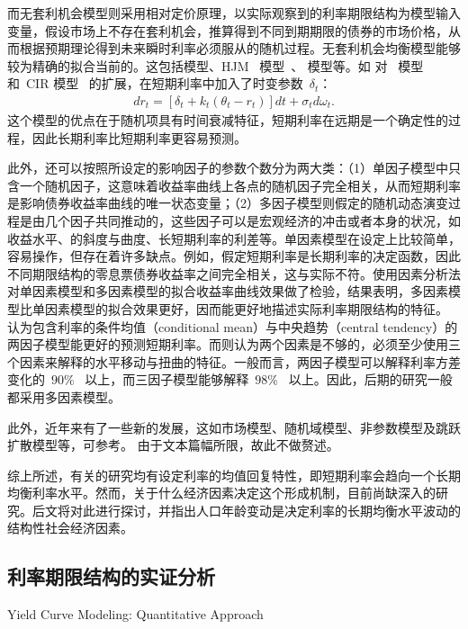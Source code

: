而无套利机会模型则采用相对定价原理，以实际观察到的利率期限结构为模型输入变量，假设市场上不存在套利机会，推算得到不同到期期限的债券的市场价格，从而根据预期理论得到未来瞬时利率必须服从的随机过程。无套利机会均衡模型能够较为精确的拟合当前的\ts{}。这包括模型、HJM~ 模型~\cite{heath1992bond}、 模型等。如 对\citeauthor{vasicek1977equilibrium}~ 模型和~CIR 模型~\cite{cox1985theory} 的扩展，在短期利率中加入了时变参数~$\delta_t$：
\begin{align}
  dr_t = [\delta_t + k_t(\theta_t - r_t)] dt + \sigma_t d \omega_t.
\end{align}
这个模型的优点在于随机项具有时间衰减特征，短期利率在远期是一个确定性的过程，因此长期利率比短期利率更容易预测。

此外，\tsm 还可以按照所设定的影响因子的参数个数分为两大类：（1）单因子模型中只含一个随机因子，这意味着收益率曲线上各点的随机因子完全相关，从而短期利率是影响债券收益率曲线的唯一状态变量；（2）多因子模型则假定\ts 的随机动态演变过程是由几个因子共同推动的，这些因子可以是宏观经济的冲击或者\yc 本身的状况，如收益水平、\yc 的斜度与曲度、长短期利率的利差等。单因素模型在设定上比较简单，容易操作，但存在着许多缺点。例如，假定短期利率是长期利率的决定函数，因此不同期限结构的零息票债券收益率之间完全相关，这与实际不符。使用因素分析法对单因素模型和多因素模型的拟合收益率曲线效果做了检验，结果表明，多因素模型比单因素模型的拟合效果更好，因而能更好地描述实际利率期限结构的特征。 认为包含利率的条件均值（conditional mean）与中央趋势（central tendency）的两因子模型能更好的预测短期利率。而则认为两个因素是不够的，必须至少使用三个因素来解释\ts 的水平移动与扭曲的特征。一般而言，两因子模型可以解释利率方差变化的~$90\%$~ 以上，而三因子模型能够解释~$98\%$~ 以上。因此，后期的研究一般都采用多因素模型。

此外，近年来\tsm 有了一些新的发展，这如市场模型、随机域模型、非参数模型及跳跃扩散模型等，可参考。 由于文本篇幅所限，故此不做赘述。

综上所述，有关\ts 的研究均有设定利率的均值回复特性，即短期利率会趋向一个长期均衡利率水平。然而，关于什么经济因素决定这个形成机制，目前尚缺深入的研究。后文将对此进行探讨，并指出人口年龄变动是决定利率的长期均衡水平波动的结构性社会经济因素。

\subsection{利率期限结构的实证分析}{Yield Curve Modeling: Quantitative Approach}


